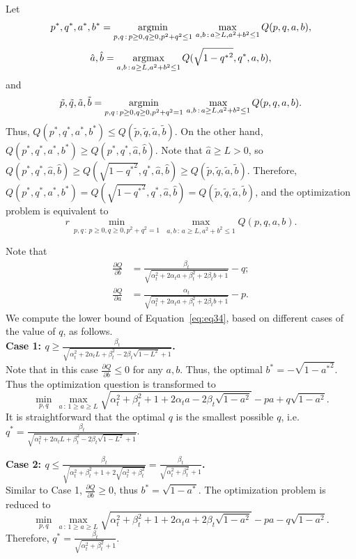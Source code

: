 Let 
\[
p^*,q^*,a^*,b^* = \operatorname*{argmin}_{p,q\,:\,p\ge 0, q\ge 0, p^2+q^2\le 1}\, \max_{a,b\,:\, a\ge L, a^2+b^2\le 1} Q(p,q,a,b),
\]
\[
\hat{a},\hat{b} = \operatorname*{argmax}_{a,b\,:\, a\ge L, a^2+b^2\le 1} Q(\sqrt{1-{q^*}^2},q^*,a,b),
\]
and 
\[
\tilde{p},\tilde{q},\tilde{a},\tilde{b} = \operatorname*{argmin}_{p,q\,:\,p\ge 0, q\ge 0, p^2+q^2= 1}\, \max_{a,b\,:\, a\ge L, a^2+b^2\le 1} Q(p,q,a,b).
\]
Thus, $Q(p^*,q^*,a^*,b^*) \le Q(\tilde{p},\tilde{q},\tilde{a},\tilde{b})$. On the other hand, $Q(p^*,q^*,a^*,b^*) \ge Q(p^*,q^*,\hat{a},\hat{b})$. Note that $\hat{a}\ge L > 0$, so $Q(p^*,q^*,\hat{a},\hat{b}) \ge Q(\sqrt{1-{q^*}^2}, q^*, \hat{a},\hat{b}) \ge Q(\tilde{p},\tilde{q},\tilde{a},\tilde{b})$.
Therefore, $Q(p^*,q^*,a^*,b^*) = Q(\sqrt{1-{q^*}^2}, q^*, \hat{a},\hat{b}) = Q(\tilde{p},\tilde{q},\tilde{a},\tilde{b})$, and the optimization problem is equivalent to 
\[
r \, \min_{p,q\,:\,p\ge 0, q\ge 0, p^2+q^2= 1}\, \max_{a,b\,:\, a\ge L, a^2+b^2\le 1} Q(p,q,a,b).
\]

Note that 
\begin{align*}
\frac{\partial Q}{\partial b}& =\frac{\beta_t}{\sqrt{\alpha_t^2+2\alpha_ta + \beta_t^2+2\beta_tb + 1}} - q; \\
\frac{\partial Q}{\partial a}& =\frac{\alpha_t}{\sqrt{\alpha_t^2+2\alpha_ta + \beta_t^2+2\beta_tb + 1}} - p.
\end{align*}
We compute the lower bound of Equation~\eqref{eq:eq34}, based on different cases of the value of $q$, as follows.\\

{\bf Case 1: $q\ge \frac{\beta_t}{\sqrt{\alpha_t^2+2\alpha_tL + \beta_t^2 - 2\beta_t\sqrt{1-L^2} + 1}}$.} \\
Note that in this case $\frac{\partial Q}{\partial b} \le 0$ for any $a,b$. Thus, the optimal $b^* = -\sqrt{1-{a^*}^2}$. Thus the optimization question is transformed to 
\[
\min_{p,q}\, \max_{a\,:\, 1\ge a\ge L} \sqrt{\alpha_t^2 + \beta_t^2+1+2\alpha_ta - 2\beta_t\sqrt{1-a^2}} -pa +q\sqrt{1-a^2}.
\]
It is straightforward that the optimal $q$ is the smallest possible $q$, i.e. $q^* = \frac{\beta_t}{\sqrt{\alpha_t^2+2\alpha_tL + \beta_t^2 - 2\beta_t\sqrt{1-L^2} + 1}}$.

{\bf Case 2: $q\le \frac{\beta_t}{\sqrt{\alpha_t^2 + \beta_t^2 +1 +2\sqrt{\alpha_t^2+\beta_t^2}}} = \frac{\beta_t}{\sqrt{\alpha_t^2+\beta_t^2}+1}$.} \\
Similar to Case 1, $\frac{\partial Q}{\partial b} \ge 0$, thus $b^* = \sqrt{1-a^*}$. The optimization problem is reduced to 
\[
\min_{p,q}\, \max_{a\,:\, 1\ge a\ge L} \sqrt{\alpha_t^2 + \beta_t^2+1+2\alpha_ta+2\beta_t\sqrt{1-a^2}} -pa  - q\sqrt{1-a^2}.
\]
Therefore, $q^* = \frac{\beta_t}{\sqrt{\alpha_t^2+\beta_t^2}+1}$.

